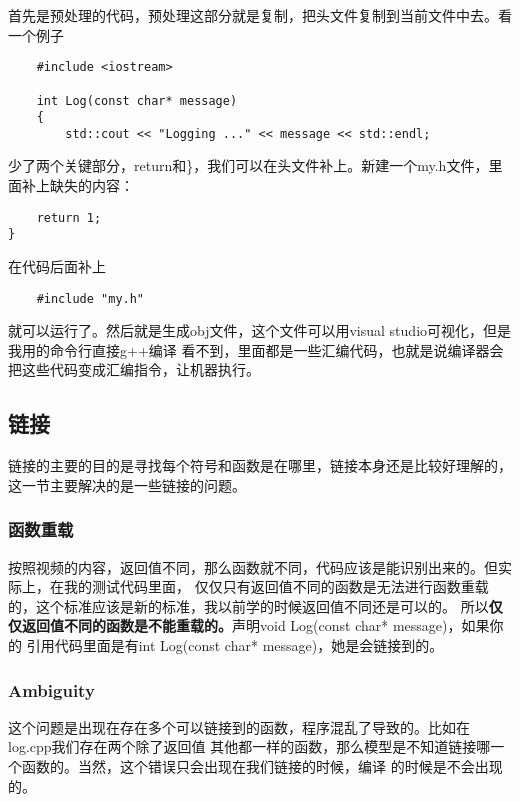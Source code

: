 \documentclass{article}
\begin{document}
\begin{sloppypar}
首先是预处理的代码，预处理这部分就是复制，把头文件复制到当前文件中去。看一个例子
\begin{lstlisting}
	#include <iostream>

	int Log(const char* message)
	{
		std::cout << "Logging ..." << message << std::endl;	
\end{lstlisting}
少了两个关键部分，return和\}，我们可以在头文件补上。新建一个my.h文件，里面补上缺失的内容：
\begin{lstlisting}
    return 1;
}
\end{lstlisting}
在代码后面补上
\begin{lstlisting}
	#include "my.h"
\end{lstlisting}
就可以运行了。然后就是生成obj文件，这个文件可以用visual studio可视化，但是我用的命令行直接g++编译
看不到，里面都是一些汇编代码，也就是说编译器会把这些代码变成汇编指令，让机器执行。

\subsection{链接}
链接的主要的目的是寻找每个符号和函数是在哪里，链接本身还是比较好理解的，这一节主要解决的是一些链接的问题。
  
\subsubsection{函数重载}
按照视频的内容，返回值不同，那么函数就不同，代码应该是能识别出来的。但实际上，在我的测试代码里面，
仅仅只有返回值不同的函数是无法进行函数重载的，这个标准应该是新的标准，我以前学的时候返回值不同还是可以的。
所以\textbf{仅仅返回值不同的函数是不能重载的。}声明void Log(const char* message)，如果你的
引用代码里面是有int Log(const char* message)，她是会链接到的。

\subsubsection{Ambiguity}
这个问题是出现在存在多个可以链接到的函数，程序混乱了导致的。比如在log.cpp我们存在两个除了返回值
其他都一样的函数，那么模型是不知道链接哪一个函数的。当然，这个错误只会出现在我们链接的时候，编译
的时候是不会出现的。


\end{sloppypar}
\end{document}
